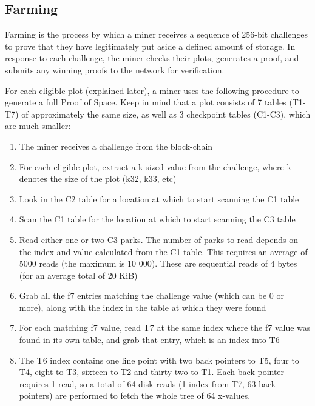 \subsection{Farming}
\begin{flushleft}
    Farming is the process by which a miner receives a sequence of 256-bit challenges to prove that they have legitimately put aside a defined amount of storage. In response to each challenge, the miner checks their plots, generates a proof, and submits any winning proofs to the network for verification.
\end{flushleft}
\begin{flushleft}
    For each eligible plot (explained later), a miner uses the following procedure to generate a full Proof of Space. Keep in mind that a plot consists of 7 tables (T1-T7) of approximately the same size, as well as 3 checkpoint tables (C1-C3), which are much smaller:
\end{flushleft}
\begin{enumerate}
    \item The miner receives a challenge from the block-chain
    \item For each eligible plot, extract a k-sized value from the challenge, where k denotes the size of the plot (k32, k33, etc)
    \item Look in the C2 table for a location at which to start scanning the C1 table
    \item Scan the C1 table for the location at which to start scanning the C3 table
    \item Read either one or two C3 parks. The number of parks to read depends on the index and value calculated from the C1 table. This requires an average of 5000 reads (the maximum is 10 000). These are sequential reads of 4 bytes (for an average total of 20 KiB)
    \item Grab all the f7 entries matching the challenge value (which can be 0 or more), along with the index in the table at which they were found
    \item For each matching f7 value, read T7 at the same index where the f7 value was found in its own table, and grab that entry, which is an index into T6
    \item The T6 index contains one line point with two back pointers to T5, four to T4, eight to T3, sixteen to T2 and thirty-two to T1. Each back pointer requires 1 read, so a total of 64 disk reads (1 index from T7, 63 back pointers) are performed to fetch the whole tree of 64 x-values.
\end{enumerate}
